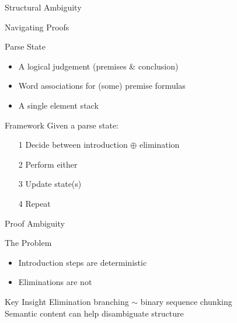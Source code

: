 \documentclass{beamer}
\begin{document}
\begin{frame}{}
	\centering
	\alert{
		Structural Ambiguity
	}
\end{frame}

\begin{frame}{Navigating Proofs}	

	\begin{block}{Parse State}
		\begin{itemize}
			\item A logical judgement (premises \& conclusion)
			\item Word associations for (some) premise formulas
			\item A single element stack
		\end{itemize}
	\end{block}
	
	\pause
	\begin{block}{Framework}	
		Given a parse state:
		\begin{itemize}
			\item[1] Decide between introduction $\oplus$ elimination
			\item[2] Perform either
			\item[3] Update state(s) 
			\item[4] Repeat
		\end{itemize}		
	\end{block}
\end{frame}

\begin{frame}{Proof Ambiguity}

	\begin{block}{The Problem}
		\begin{itemize}
			\item Introduction steps are deterministic
			\item Eliminations are not
		\end{itemize}
	\end{block}\vfill
	
	\pause
	\begin{block}{Key Insight}
		Elimination branching $\sim$ binary sequence chunking\\
		Semantic content can help disambiguate structure\\
	\end{block}\vfill
	
\end{frame}
\end{document}
